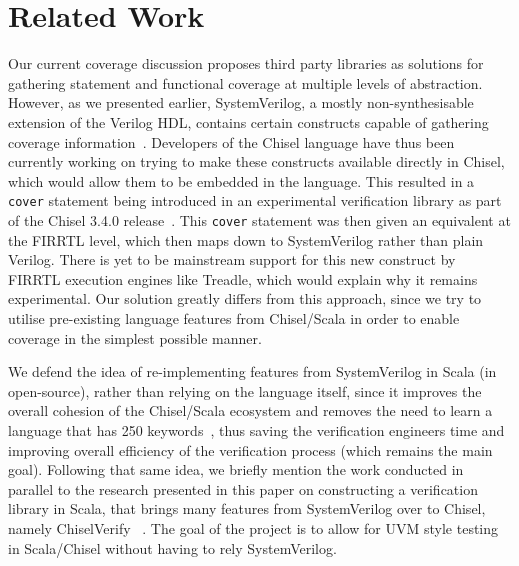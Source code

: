 \documentclass[runningheads]{llncs}
\newcommand{\martin}[1]{{\color{blue} Martin: #1}}
\renewcommand{\martin}[1]{}
\begin{document}
\section{Related Work}


Our current coverage discussion proposes third party libraries  as solutions for gathering statement and functional coverage at multiple levels of abstraction. However, as we presented earlier, SystemVerilog, a mostly non-synthesisable extension of the Verilog HDL, contains certain constructs capable of gathering coverage information~\cite{spear2008systemverilog}. Developers of the Chisel language have thus been currently working on trying to make these constructs available directly in Chisel, which would allow them to be embedded in the language. This resulted in a \texttt{cover} statement being introduced in an experimental verification library as part of the Chisel 3.4.0 release~\cite{chisel3.4release_notes}. This \texttt{cover} statement was then given an equivalent at the FIRRTL level, which then maps down to SystemVerilog rather than plain Verilog. There is yet to be mainstream support for this new construct by FIRRTL execution engines like Treadle, which would explain why it remains experimental. Our solution greatly differs from this approach, since we try to utilise pre-existing language features from Chisel/Scala in order to enable coverage in the simplest possible manner. 

We defend the idea of re-implementing features from SystemVerilog in Scala (in open-source), rather than relying on the language itself, since it improves the overall cohesion of the Chisel/Scala ecosystem and removes the need to learn a language that has 250 keywords~\cite{SystemVerilog}, thus saving the verification engineers time and improving overall efficiency of the verification process (which remains the main goal). Following that same idea, we briefly mention the work conducted in parallel to the research presented in this paper on constructing a verification library in Scala, that brings many features from SystemVerilog over to Chisel, namely ChiselVerify~\cite{blind} %
.
The goal of the project is to allow for UVM style testing in Scala/Chisel without having to rely SystemVerilog. 
\end{document}

